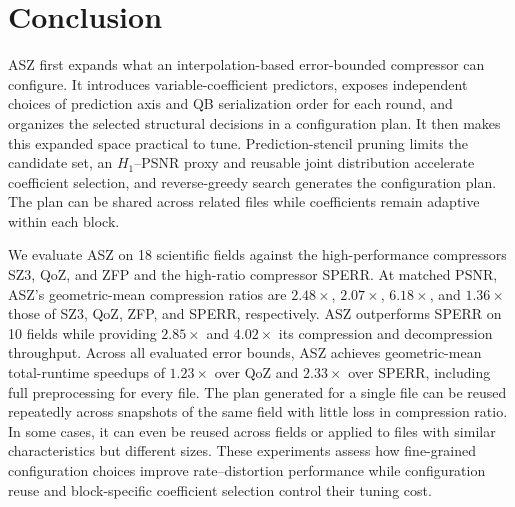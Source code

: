\section{Conclusion}
\label{sec:conclusion}

ASZ first expands what an interpolation-based error-bounded compressor can configure. It introduces variable-coefficient predictors, exposes independent choices of prediction axis and QB serialization order for each round, and organizes the selected structural decisions in a configuration plan. It then makes this expanded space practical to tune. Prediction-stencil pruning limits the candidate set, an $H_1$--PSNR proxy and reusable joint distribution accelerate coefficient selection, and reverse-greedy search generates the configuration plan. The plan can be shared across related files while coefficients remain adaptive within each block.

We evaluate ASZ on 18 scientific fields against the high-performance compressors SZ3, QoZ, and ZFP and the high-ratio compressor SPERR. At matched PSNR, ASZ's geometric-mean compression ratios are $2.48\times$, $2.07\times$, $6.18\times$, and $1.36\times$ those of SZ3, QoZ, ZFP, and SPERR, respectively. ASZ outperforms SPERR on 10 fields while providing $2.85\times$ and $4.02\times$ its compression and decompression throughput. Across all evaluated error bounds, ASZ achieves geometric-mean total-runtime speedups of $1.23\times$ over QoZ and $2.33\times$ over SPERR, including full preprocessing for every file. The plan generated for a single file can be reused repeatedly across snapshots of the same field with little loss in compression ratio. In some cases, it can even be reused across fields or applied to files with similar characteristics but different sizes. These experiments assess how fine-grained configuration choices improve rate--distortion performance while configuration reuse and block-specific coefficient selection control their tuning cost.
